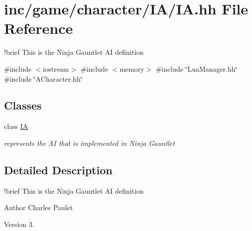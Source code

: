 \hypertarget{IA_8hh}{}\section{inc/game/character/\+I\+A/\+IA.hh File Reference}
\label{IA_8hh}


!brief This is the Ninja Gauntlet AI definition  


{\ttfamily \#include $<$iostream$>$}\newline
{\ttfamily \#include $<$memory$>$}\newline
{\ttfamily \#include \char`\"{}Lua\+Manager.\+hh\char`\"{}}\newline
{\ttfamily \#include \char`\"{}A\+Character.\+hh\char`\"{}}\newline
\subsection*{Classes}
\begin{DoxyCompactItemize}
\item 
class \hyperlink{classIA}{IA}
\begin{DoxyCompactList}\small\item\em represents the AI that is implemented in Ninja Gauntlet \end{DoxyCompactList}\end{DoxyCompactItemize}


\subsection{Detailed Description}
!brief This is the Ninja Gauntlet AI definition 

\begin{DoxyAuthor}{Author}
Charles Paulet 
\end{DoxyAuthor}
\begin{DoxyVersion}{Version}
3. 
\end{DoxyVersion}
